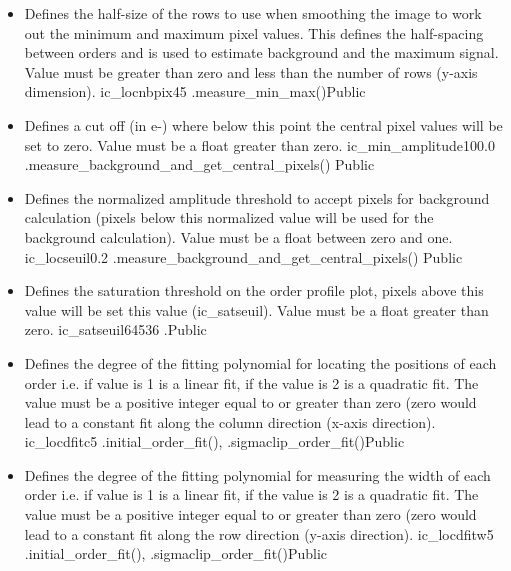 \begin{itemize}
\item {}
{Defines the half-size of the rows to use when smoothing the image to work out the minimum and maximum pixel values. This defines the half-spacing between orders and is used to estimate background and the maximum signal. Value must be greater than zero and less than the number of rows (y-axis dimension).}
{ic\_locnbpix}{45}
{\callocRAW}{\constantsfile}
{\spirouBACK.measure\_min\_max()}{Public}

\item {}
{Defines a cut off (in e-) where below this point the central pixel values will be set to zero. Value must be a float greater than zero.}
{ic\_min\_amplitude}{100.0}
{\callocRAW}{\constantsfile}{\spirouBACK.measure\_background\_{\hskip 0pt}and\_get\_central\_pixels()}
{Public}

\item {}
{Defines the normalized amplitude threshold to accept pixels for background calculation (pixels below this normalized value will be used for the background calculation). Value must be a float between zero and one.}
{ic\_locseuil}{0.2}
{\callocRAW}{\constantsfile}{\spirouBACK.measure\_background\_{\hskip 0pt}and\_get\_central\_pixels()}
{Public}

\item {}
{Defines the saturation threshold on the order profile plot, pixels above this value will be set this value (ic\_satseuil). Value must be a float greater than zero.}
{ic\_satseuil}{64536}
{\callocRAW}{\constantsfile}{\callocRAW.\progMAIN}{Public}


\item {} 
{Defines the degree of the fitting polynomial for locating the positions of each order i.e. if value is 1 is a linear fit, if the value is 2 is a quadratic fit. The value must be a positive integer equal to or greater than zero (zero would lead to a constant fit along the column direction (x-axis direction).}
{ic\_locdfitc}{5}
{\callocRAW}{\constantsfile}{\spirouLOCOR.initial\_order\_fit(), \spirouLOCOR.sigmaclip\_order\_fit()}{Public}


\item {}
{Defines the degree of the fitting polynomial for measuring the width of each order i.e. if value is 1 is a linear fit, if the value is 2 is a quadratic fit. The value must be a positive integer equal to or greater than zero (zero would lead to a constant fit along the row direction (y-axis direction).}
{ic\_locdfitw}{5}
{\callocRAW}{\constantsfile}{\spirouLOCOR.initial\_order\_fit(), \spirouLOCOR.sigmaclip\_order\_fit()}{Public}



\end{itemize}

